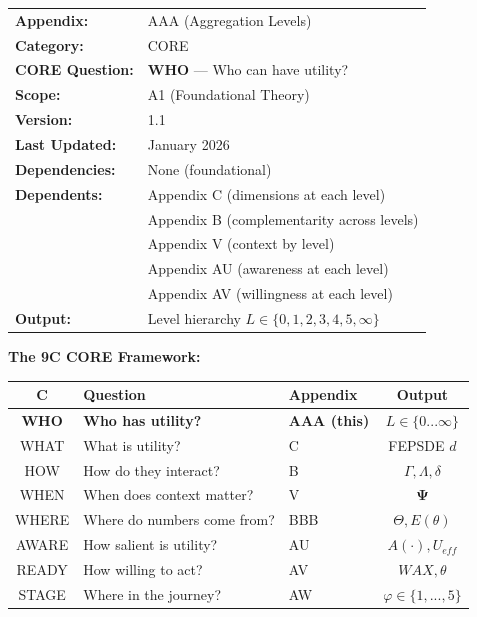 \begin{tcolorbox}[colback=red!5!white, colframe=red!75!black, 
    title=\textbf{CORE Appendix: Aggregation Levels}]

\begin{tabular}{@{}ll@{}}
\textbf{Appendix:} & AAA (Aggregation Levels) \\
\textbf{Category:} & CORE \\
\textbf{CORE Question:} & \textbf{WHO} --- Who can have utility? \\
\textbf{Scope:} & A1 (Foundational Theory) \\
\textbf{Version:} & 1.1 \\
\textbf{Last Updated:} & January 2026 \\
\textbf{Dependencies:} & None (foundational) \\
\textbf{Dependents:} & Appendix C (dimensions at each level) \\
 & Appendix B (complementarity across levels) \\
 & Appendix V (context by level) \\
 & Appendix AU (awareness at each level) \\
 & Appendix AV (willingness at each level) \\
\textbf{Output:} & Level hierarchy $L \in \{0, 1, 2, 3, 4, 5, \infty\}$ \\
\end{tabular}

\vspace{0.3cm}

\textbf{The 9C CORE Framework:}
\begin{center}
\small
\begin{tabular}{@{}cllc@{}}
\toprule
\textbf{C} & \textbf{Question} & \textbf{Appendix} & \textbf{Output} \\
\midrule
\textbf{WHO} & \textbf{Who has utility?} & \textbf{AAA (this)} & $L \in \{0...\infty\}$ \\
WHAT & What is utility? & C & FEPSDE $d$ \\
HOW & How do they interact? & B & $\Gamma, \Lambda, \delta$ \\
WHEN & When does context matter? & V & $\boldsymbol{\Psi}$ \\
WHERE & Where do numbers come from? & BBB & $\Theta, E(\theta)$ \\
\midrule
AWARE & How salient is utility? & AU & $A(\cdot), U_{eff}$ \\
READY & How willing to act? & AV & $WAX, \theta$ \\
STAGE & Where in the journey? & AW & $\varphi \in \{1,...,5\}$ \\
\bottomrule
\end{tabular}
\end{center}

\end{tcolorbox}

